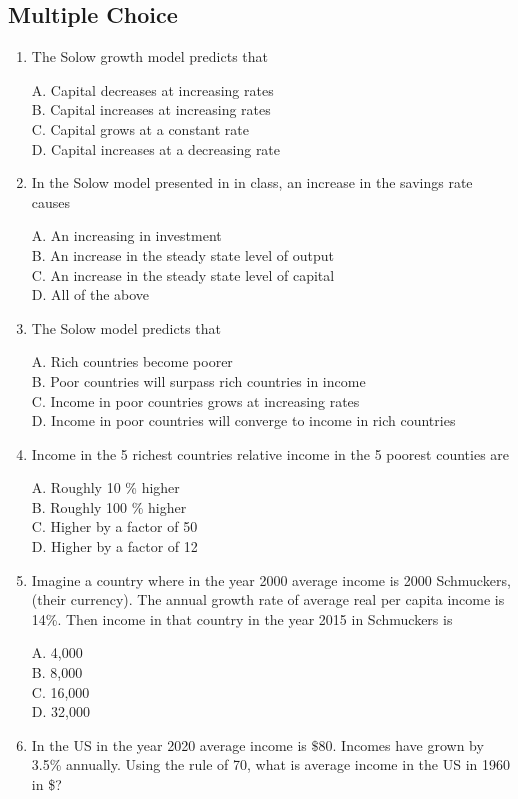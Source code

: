 \documentclass[
]{book}
\begin{document}
\hypertarget{multiple-choice-1}{%
\subsection{Multiple Choice}\label{multiple-choice-1}}

\begin{enumerate}
\def\labelenumi{\arabic{enumi}.}
\item
  The Solow growth model predicts that

  A. Capital decreases at increasing rates\\
  B. Capital increases at increasing rates\\
  C. Capital grows at a constant rate\\
  D. Capital increases at a decreasing rate
\item
  In the Solow model presented in in class, an increase in the savings rate causes

  A. An increasing in investment\\
  B. An increase in the steady state level of output\\
  C. An increase in the steady state level of capital\\
  D. All of the above
\item
  The Solow model predicts that

  A. Rich countries become poorer\\
  B. Poor countries will surpass rich countries in income\\
  C. Income in poor countries grows at increasing rates\\
  D. Income in poor countries will converge to income in rich countries
\item
  Income in the 5 richest countries relative income in the 5 poorest counties are

  A. Roughly 10 \% higher\\
  B. Roughly 100 \% higher\\
  C. Higher by a factor of 50\\
  D. Higher by a factor of 12
\item
  Imagine a country where in the year 2000 average income is 2000 Schmuckers, (their currency). The annual growth rate of average real per capita income is 14\%. Then income in that country in the year 2015 in Schmuckers is

  A. 4,000\\
  B. 8,000\\
  C. 16,000\\
  D. 32,000
\item
  In the US in the year 2020 average income is \(\$80\). Incomes have grown by 3.5\% annually. Using the rule of 70, what is average income in the US in 1960 in \$?


\end{enumerate}
\end{document}
